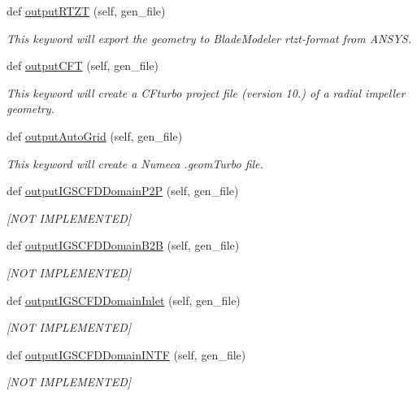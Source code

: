 \begin{DoxyCompactItemize}
def \hyperlink{a00073_a27407b1e60e56fceec34147b9b793a74}{output\+R\+T\+ZT} (self, gen\+\_\+file)
\begin{DoxyCompactList}\small\item\em This keyword will export the geometry to Blade\+Modeler rtzt-\/format from A\+N\+S\+YS. \end{DoxyCompactList}\item 
def \hyperlink{a00073_ad727ca92f2959a8d915939c73f3dbff1}{output\+C\+FT} (self, gen\+\_\+file)
\begin{DoxyCompactList}\small\item\em This keyword will create a C\+Fturbo project file (version 10.) of a radial impeller geometry. \end{DoxyCompactList}\item 
def \hyperlink{a00073_a61f9db1d33a2cb583c3f779a94ec700d}{output\+Auto\+Grid} (self, gen\+\_\+file)
\begin{DoxyCompactList}\small\item\em This keyword will create a Numeca .geom\+Turbo file. \end{DoxyCompactList}\item 
def \hyperlink{a00073_aa7a1b9b7db9021015b02a691075d88e3}{output\+I\+G\+S\+C\+F\+D\+Domain\+P2P} (self, gen\+\_\+file)
\begin{DoxyCompactList}\small\item\em \mbox{[}N\+OT I\+M\+P\+L\+E\+M\+E\+N\+T\+ED\mbox{]} \end{DoxyCompactList}\item 
def \hyperlink{a00073_a8e556016279f9aabdabb9b6f708c95cb}{output\+I\+G\+S\+C\+F\+D\+Domain\+B2B} (self, gen\+\_\+file)
\begin{DoxyCompactList}\small\item\em \mbox{[}N\+OT I\+M\+P\+L\+E\+M\+E\+N\+T\+ED\mbox{]} \end{DoxyCompactList}\item 
def \hyperlink{a00073_a1a577ed1880def26fc13d02701e9346a}{output\+I\+G\+S\+C\+F\+D\+Domain\+Inlet} (self, gen\+\_\+file)
\begin{DoxyCompactList}\small\item\em \mbox{[}N\+OT I\+M\+P\+L\+E\+M\+E\+N\+T\+ED\mbox{]} \end{DoxyCompactList}\item 
def \hyperlink{a00073_aa16a1dab2d93130c1cc0b4c24ec2caef}{output\+I\+G\+S\+C\+F\+D\+Domain\+I\+N\+TF} (self, gen\+\_\+file)
\begin{DoxyCompactList}\small\item\em \mbox{[}N\+OT I\+M\+P\+L\+E\+M\+E\+N\+T\+ED\mbox{]} \end{DoxyCompactList}\item 

\end{DoxyCompactItemize}
